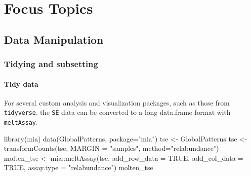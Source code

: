 \documentclass[
]{book}
\newenvironment{Shaded}{\begin{snugshade}}{\end{snugshade}}
\newcommand{\AttributeTok}[1]{\textcolor[rgb]{0.77,0.63,0.00}{#1}}
\newcommand{\ConstantTok}[1]{\textcolor[rgb]{0.00,0.00,0.00}{#1}}
\newcommand{\FunctionTok}[1]{\textcolor[rgb]{0.00,0.00,0.00}{#1}}
\newcommand{\NormalTok}[1]{#1}
\newcommand{\OtherTok}[1]{\textcolor[rgb]{0.56,0.35,0.01}{#1}}
\newcommand{\SpecialCharTok}[1]{\textcolor[rgb]{0.00,0.00,0.00}{#1}}
\newcommand{\StringTok}[1]{\textcolor[rgb]{0.31,0.60,0.02}{#1}}
\begin{document}
\hypertarget{part-focus-topics}{%
\part{Focus Topics}\label{part-focus-topics}}

\hypertarget{datamanipulation}{%
\chapter{Data Manipulation}\label{datamanipulation}}

\hypertarget{tidying-and-subsetting}{%
\section{Tidying and subsetting}\label{tidying-and-subsetting}}

\hypertarget{tidy-data}{%
\subsection{Tidy data}\label{tidy-data}}

For several custom analysis and visualization packages, such as those from
\texttt{tidyverse}, the \texttt{SE} data can be converted to a long data.frame format with
\texttt{meltAssay}.

\begin{Shaded}
\begin{Highlighting}[]
\FunctionTok{library}\NormalTok{(mia)}
\FunctionTok{data}\NormalTok{(GlobalPatterns, }\AttributeTok{package=}\StringTok{"mia"}\NormalTok{)}
\NormalTok{tse }\OtherTok{\textless{}{-}}\NormalTok{ GlobalPatterns}
\NormalTok{tse }\OtherTok{\textless{}{-}} \FunctionTok{transformCounts}\NormalTok{(tse, }\AttributeTok{MARGIN =} \StringTok{"samples"}\NormalTok{, }\AttributeTok{method=}\StringTok{"relabundance"}\NormalTok{)}
\NormalTok{molten\_tse }\OtherTok{\textless{}{-}}\NormalTok{ mia}\SpecialCharTok{::}\FunctionTok{meltAssay}\NormalTok{(tse,}
                        \AttributeTok{add\_row\_data =} \ConstantTok{TRUE}\NormalTok{,}
                        \AttributeTok{add\_col\_data =} \ConstantTok{TRUE}\NormalTok{,}
                        \AttributeTok{assay.type =} \StringTok{"relabundance"}\NormalTok{)}
\NormalTok{molten\_tse}
\end{Highlighting}
\end{Shaded}
\end{document}
